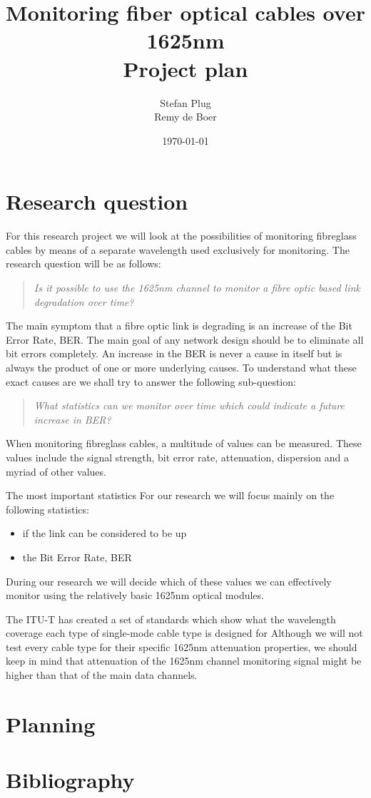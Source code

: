 \documentclass{article}
\begin{document}
\title{Monitoring fiber optical cables over 1625nm\\Project plan}
\author{Stefan Plug\\Remy de Boer}
\date{\today}
\maketitle

\section{Research question}
For this research project we will look at the possibilities of monitoring fibreglass cables by means of a separate wavelength used exclusively for monitoring.
The research question will be as follows:
\begin{quote}
\textit{
Is it possible to use the 1625nm channel to monitor a fibre optic based link degradation over time?
}
\end{quote}

The main symptom that a fibre optic link is degrading is an increase of the Bit Error Rate, BER.
The main goal of any network design should be to eliminate all bit errors completely.
An increase in the BER is never a cause in itself but is always the product of one or more underlying causes. To understand what these exact causes are we shall try to answer the following sub-question:
\begin{quote}
\textit{
What statistics can we monitor over time which could indicate a future increase in BER?
}
\end{quote}



When monitoring fibreglass cables, a multitude of values can be measured.
These values include the signal strength, bit error rate, attenuation, dispersion and a myriad of other values.

The most important statistics For our research we will focus mainly on the following statistics:
\begin{itemize}
\item if the link can be considered to be up
\item the Bit Error Rate, BER
\end{itemize}

During our research we will decide which of these values we can effectively monitor using the relatively basic 1625nm optical modules.



The ITU-T has created a set of standards which show what the wavelength coverage each type of single-mode cable type is designed for \cite[p.~21]{refguide:2011} 
Although we will not test every cable type for their specific 1625nm attenuation properties, we should keep in mind that attenuation of the 1625nm channel monitoring signal might be higher than that of the main data channels.





\section{Planning}

\section{Bibliography}


\end{document}
